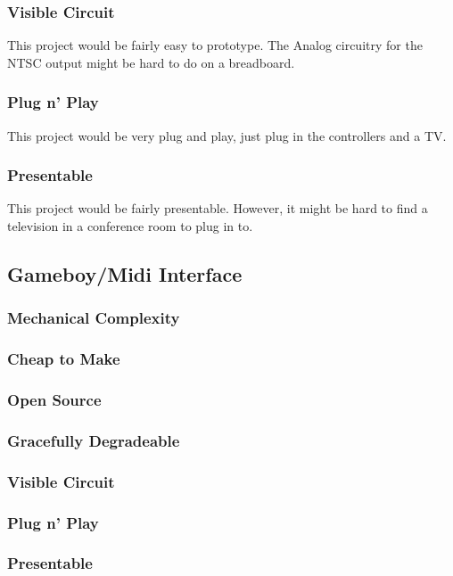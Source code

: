 \documentclass{article}
\begin{document}
\subsubsection{Visible Circuit}
This project would be fairly easy to prototype. The Analog circuitry
for the NTSC output might be hard to do on a breadboard. 
\subsubsection{Plug n' Play}
This project would be very plug and play, just plug in the controllers and a TV.
\subsubsection{Presentable}
This project would be fairly presentable. However, it might be hard to
find a television in a conference room to plug in to. 

\subsection{Gameboy/Midi Interface}
\subsubsection {Mechanical Complexity}
\subsubsection{Cheap to Make}
\subsubsection{Open Source}
\subsubsection{Gracefully Degradeable}
\subsubsection{Visible Circuit}
\subsubsection{Plug n' Play}
\subsubsection{Presentable}
\end{document}
